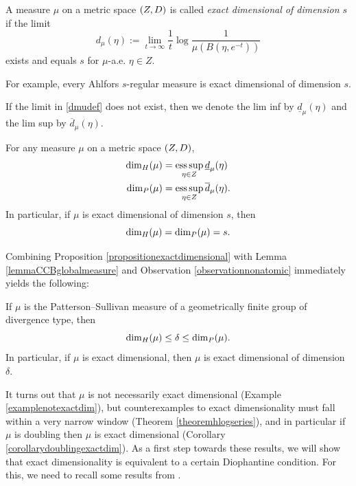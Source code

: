 \begin{definition}
\label{definitionexactdimensional}
A measure $\mu$ on a metric space $(Z,D)$ is called \emph{exact dimensional of dimension $s$} if the limit
\begin{equation}
\label{dmudef}
d_\mu(\eta) := \lim_{t\to\infty} \frac1t \log\frac{1}{\mu(B(\eta,e^{-t}))}
\end{equation}
exists and equals $s$ for $\mu$-a.e. $\eta\in Z$.
\end{definition}

For example, every Ahlfors $s$-regular measure is exact dimensional of dimension $s$.

If the limit in \eqref{dmudef} does not exist, then we denote the lim inf by $\underline d_\mu(\eta)$ and the lim sup by $\overline d_\mu(\eta)$.

\begin{proposition}
\label{propositionexactdimensional}
For any measure $\mu$ on a metric space $(Z,D)$,
\begin{align*}
{\dim_H}(\mu) &= \operatorname*{ess\,sup}_{\eta\in Z} \underline d_\mu(\eta)\\
{\dim_P}(\mu) &= \operatorname*{ess\,sup}_{\eta\in Z} \overline d_\mu(\eta).
\end{align*}
In particular, if $\mu$ is exact dimensional of dimension $s$, then
\[
{\dim_H}(\mu) = {\dim_P}(\mu) = s.
\]
\end{proposition}

Combining Proposition \ref{propositionexactdimensional} with Lemma \ref{lemmaCCBglobalmeasure} and Observation \ref{observationnonatomic} immediately yields the following:

\begin{observation}
\label{observationHDdeltaPD}
If $\mu$ is the Patterson--Sullivan measure of a geometrically finite group of divergence type, then
\[
{\dim_H}(\mu) \leq \delta \leq {\dim_P}(\mu).
\]
In particular, if $\mu$ is exact dimensional, then $\mu$ is exact dimensional of dimension $\delta$.
\end{observation}

It turns out that $\mu$ is not necessarily exact dimensional (Example \ref{examplenotexactdim}), but counterexamples to exact dimensionality must fall within a very narrow window (Theorem \ref{theoremhlogseries}), and in particular if $\mu$ is doubling then $\mu$ is exact dimensional (Corollary \ref{corollarydoublingexactdim}). As a first step towards these results, we will show that exact dimensionality is equivalent to a certain Diophantine condition. For this, we need to recall some results from \cite{FSU4}.

